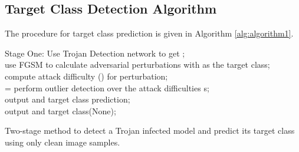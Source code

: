 \documentclass{article}
\begin{document}
\subsection*{Target Class Detection Algorithm}
The procedure for target class prediction is given in Algorithm \ref{alg:algorithm1}.

\begin{algorithm}[H]
Stage One: Use Trojan Detection network to get ; \\
    {\For{ \KwTo  }
        {
            use FGSM to calculate adversarial perturbations with  as the target class;\\
            compute attack difficulty () for perturbation;\\
        }
         = perform outlier detection over the attack difficulties s;\\
        output  and target class prediction;\\
    }
    {
        output  and target class(None);\\
    }
 
 \caption{Two-stage method to detect a Trojan infected model and predict its target class using only clean image samples.}
 \label{alg:algorithm1}
\end{algorithm}
\end{document}
